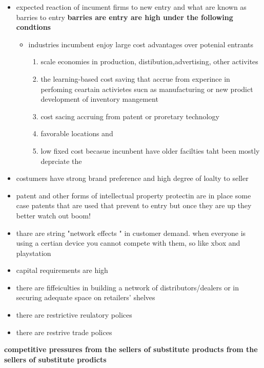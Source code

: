 \documentclass{report}
\begin{document}
\begin{itemize}
\item expected reaction of incument firms to new entry and what are  known as barries to entry
\textbf{barries are entry are high under the following condtions}
\begin{itemize}
\item industries incumbent enjoy large cost advantages over potenial entrants 
\begin{enumerate}


\item scale  economies in production, distibution,advertising, other activites 
\item the learning-based cost saving that accrue from experince in perfoming ceartain activietes sucn as manufacturing or new prodict development of inventory mangement
\item cost sacing  accruing from patent or proretary technology 
\item favorable locations and 
\item low fixed cost becasue incunbent have older facilties taht been mostly deprciate the 

 
\end{enumerate}

\end{itemize}

\item costumers have strong brand preference and high degree of loalty to seller 
\item patent and other forms of intellectual property protectin are in place
some case patents that are used that prevent to entry but once they are up they better watch out boom!
\item thare are string "network effects " in customer demand. 
when everyone is using a certian device you cannot compete with them, so like xbox and playstation 
\item capital requirements are high 
\item there are fiffeiculties in building a network of distributors/dealers or in securing adequate space on retailers' shelves 
\item there are restrictive reulatory polices 

\item there are restrive trade polices 


\end{itemize}


{\huge\textbf{competitive pressures from the sellers of substitute products from the sellers of substitute prodicts}}
\end{document}
